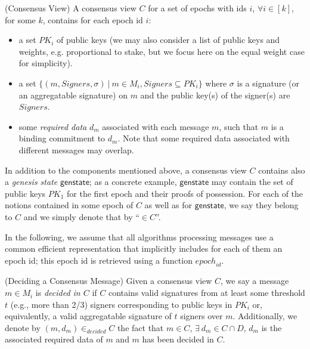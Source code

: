 \begin{definition}(Consensus View) A consensus view $C$ for a set of epochs with ids $i$, $\forall i \in [k]$, 
for some $k$, contains for each epoch id $i$:
\begin{itemize}
\item a set $PK_i$ of public keys (we may also consider a list of public keys and weights, e.g. proportional to stake, but we focus here on  
the equal weight case for simplicity). 
\item a set $\{(m, \mathit{Signers}, \sigma) \ | \ m \in M_i, \mathit{Signers} \subseteq PK_i\}$ where 
$\sigma$ is a signature (or an aggregatable signature) on $m$ and the public key(s) of the signer(s) are $\mathit{Signers}$. 
\item some \textit{required data} $d_{m}$ associated with each message $m$, such that $m$ is a binding commitment to $d_{m}$. Note 
that some required data associated with different messages may overlap. 
\end{itemize}
In addition to the components mentioned above, a consensus view $C$ contains also a \emph{genesis state} $\mathsf{genstate}$; as a concrete example,
$\mathsf{genstate}$ may contain the set of public keys $\mathit{PK_1}$ for the first epoch and their proofs of possession. For each of the notions 
contained in some epoch of $C$ as well as for $\mathsf{genstate}$, we say they belong to $C$ and we simply denote that by ``$\in C$''. 
\end{definition}

\noindent In the following, we assume that all algorithms processing messages use a common efficient representation that implicitly 
includes for each of them an epoch id; this epoch id is retrieved using a function $\mathit{epoch}_{\mathit{id}}$. 

\begin{definition}(Deciding a Consensus Message) 
\label{def_decide}
Given a consensus view $C$, we say a message $m \in M_i$ is \emph{decided in $C$} 
if $C$ contains valid signatures from at least some threshold $t$ (e.g., more than 2/3) 
signers corresponding to public keys in $PK_i$ or, equivalently, a valid aggregatable 
signature of $t$ signers over $m$. Additionally, we denote by $(\mathit{m}, d_{\mathit{m}}) \in_{\mathit{decided}} C$ 
the fact that $m \in C$, $ \exists \ d_m \in C \cap D$, $d_m$ is the associated required data of $m$ and $m$ has been decided in $C$.  
\end{definition}


